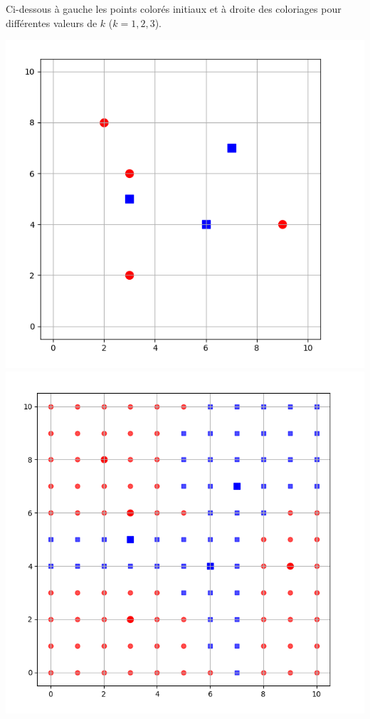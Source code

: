 \documentclass[10pt,class=report,crop=false]{standalone}
\begin{document}
\begin{activite}
\begin{enumerate}
\begin{enumerate}
	Ci-dessous à gauche les points colorés initiaux et à droite des coloriages pour différentes valeurs de $k$ ($k=1,2,3$). 
\begin{center}
	\includegraphics[scale=\myscale,scale=0.17]{ecran-voisins-8a} 
	\includegraphics[scale=\myscale,scale=0.146]{ecran-voisins-8b} 

\end{center}
\end{enumerate}
\end{enumerate}
\end{activite}
\end{document}

